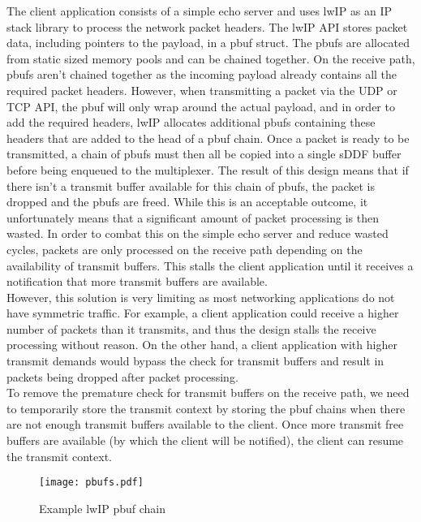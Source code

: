 The client application consists of a simple echo server and uses lwIP \cite{Dunkels_01} as an IP
stack library to process the network packet headers. The lwIP API stores packet data, including pointers
to the payload, in a pbuf struct. The pbufs are allocated from static sized memory pools and can be chained
together. On the receive path, pbufs aren't chained together as the incoming payload already contains
all the required packet headers. However, when transmitting a packet via the UDP or TCP API, the pbuf will
only wrap around the actual payload, and in order to add the required headers, lwIP allocates additional pbufs
containing these headers that are added to the head of a pbuf chain. Once a packet is ready to be transmitted,
a chain of pbufs must then all be copied into a single sDDF buffer before being enqueued to the multiplexer.
The result of this design means that if there isn't a transmit buffer available for this chain of pbufs, the
packet is dropped and the pbufs are freed. While this is an acceptable outcome, it unfortunately means that a significant
amount of packet processing is then wasted. In order to combat this on the simple echo server and reduce
wasted cycles, packets are only
processed on the receive path depending on the availability of transmit buffers. This stalls the client application
until it receives a notification that more transmit buffers are available. \\
However, this solution is very limiting
as most networking applications do not have symmetric traffic. For example, a client application could receive a
higher number of packets than it transmits, and thus the design stalls the receive processing without reason. 
On the other hand, a client application with higher transmit demands would bypass the check for transmit buffers and result in
packets being dropped after packet processing. \\
To remove the premature check for transmit buffers on the receive path, we need to 
temporarily store the transmit context by storing the pbuf chains when there are not enough transmit buffers
available to the client. Once more transmit free buffers are available (by which the client will be notified),
the client can resume the transmit context. 

\begin{figure}[h]
    \centering
    \texttt{[image: pbufs.pdf]}
    \caption{Example lwIP pbuf chain}
    \label{f:pbufs}
\end{figure}

